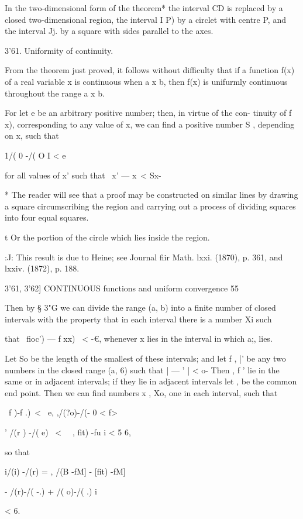 In the two-dimensional form of the theorem* the interval CD is
replaced by a closed two-dimensional region, the interval I P) by a
circlet with centre P, and the interval Jj. by a square with sides
parallel to the axes.

3'61. Uniformity of continuity.

From the theorem just proved, it follows without difficulty that if a
function f(x) of a real variable x is continuous when a x b, then f(x)
is unifurmly continuous throughout the range a x b.

For let e be an arbitrary positive number; then, in virtue of the
con- tinuity of f x), corresponding to any value of x, we can find a
positive number S , depending on x, such that

1/( 0 -/( O I < e

for all values of x' such that \ x' — x\ < Sx-

* The reader will see that a proof may be constructed on similar lines
by drawing a square circumscribing the region and carrying out a
process of dividing squares into four equal squares.

t Or the portion of the circle which lies inside the region.

:J: This result is due to Heine; see Journal fiir Math. lxxi. (1870),
p. 361, and lxxiv. (1872), p. 188.



3'61, 3'62] CONTINUOUS functions and uniform convergence 55

Then by § 3"G we can divide the range (a, b) into a finite number of
closed intervals with the property that in each interval there is a
number Xi such

that \ fioc') — f xx) \ < -€, whenever x lies in the interval in which
a;, lies.

Let So be the length of the smallest of these intervals; and let f ,
|' be any two numbers in the closed range (a, 6) such that | — ' | <
o- Then , f ' lie in the same or in adjacent intervals; if they lie
in adjacent intervals let , be the common end point. Then we can find
numbers x , Xo, one in each interval, such that

\ f )-f .)\ < \ e, ,/(?o)-/(- 0 < f>

' /(r ) -/( e) \ < \ \ , fit) -fu i < 5 6,

so that

i/(i) -/(r) = , /(B -fM] - [fit) -fM]

- /(r)-/( -.) + /( o)-/( .) i

< 6.

